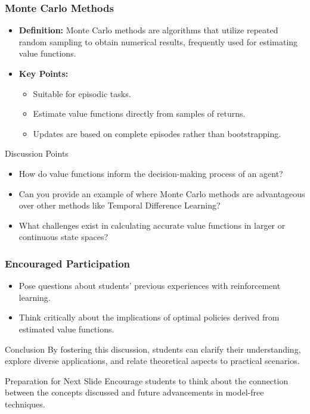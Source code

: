 \documentclass[aspectratio=169]{beamer}
\begin{document}
\begin{frame}[fragile]
    \frametitle{Monte Carlo Methods}
    \begin{itemize}
        \item \textbf{Definition:} Monte Carlo methods are algorithms that utilize repeated random sampling to obtain numerical results, frequently used for estimating value functions.
        \item \textbf{Key Points:}
        \begin{itemize}
            \item Suitable for episodic tasks.
            \item Estimate value functions directly from samples of returns.
            \item Updates are based on complete episodes rather than bootstrapping.
        \end{itemize}
    \end{itemize}
    \begin{block}{Discussion Points}
        \begin{itemize}
            \item How do value functions inform the decision-making process of an agent?
            \item Can you provide an example of where Monte Carlo methods are advantageous over other methods like Temporal Difference Learning?
            \item What challenges exist in calculating accurate value functions in larger or continuous state spaces?
        \end{itemize}
    \end{block}
\end{frame}

\begin{frame}[fragile]
    \frametitle{Encouraged Participation}
    \begin{itemize}
        \item Pose questions about students' previous experiences with reinforcement learning.
        \item Think critically about the implications of optimal policies derived from estimated value functions.
    \end{itemize}
    \begin{block}{Conclusion}
        By fostering this discussion, students can clarify their understanding, explore diverse applications, and relate theoretical aspects to practical scenarios.
    \end{block}
    \begin{block}{Preparation for Next Slide}
        Encourage students to think about the connection between the concepts discussed and future advancements in model-free techniques.
    \end{block}
\end{frame}
\end{document}
